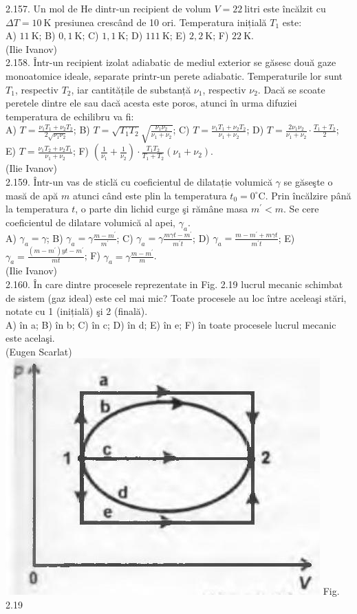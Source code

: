 2.157. Un mol de He dintr-un recipient de volum $V=22 \mathrm{~litri}$ este încălzit cu $\Delta T=10 \mathrm{~K}$ presiunea crescând de 10 ori. Temperatura inițială $T_{1}$ este:\\ A) $11 \mathrm{~K}$; B) $0,1 \mathrm{~K}$; C) $1,1 \mathrm{~K}$; D) $111 \mathrm{~K}$; E) $2,2 \mathrm{~K}$; F) $22 \mathrm{~K}$.\\ (Ilie Ivanov)\\

2.158. Într-un recipient izolat adiabatic de mediul exterior se găsesc două gaze monoatomice ideale, separate printr-un perete adiabatic. Temperaturile lor sunt $T_{1}$, respectiv $T_{2}$, iar cantitățile de substanță $\nu_{1}$, respectiv $\nu_{2}$. Dacă se scoate peretele dintre ele sau dacă acesta este poros, atunci în urma difuziei temperatura de echilibru va fi:\\ A) $T=\frac{\nu_{1} T_{1}+\nu_{2} T_{2}}{2 \sqrt{\nu_{1} \nu_{2}}}$; B) $T=\sqrt{T_{1} T_{2}} \sqrt{\frac{\nu_{1} \nu_{2}}{\nu_{1}+\nu_{2}}}$; C) $T=\frac{\nu_{1} T_{1}+\nu_{2} T_{2}}{\nu_{1}+\nu_{2}}$; D) $T=\frac{2 \nu_{1} \nu_{2}}{\nu_{1}+\nu_{2}} \cdot \frac{T_{1}+T_{2}}{2}$; E) $T=\frac{\nu_{1} T_{2}+\nu_{2} T_{1}}{\nu_{1}+\nu_{2}}$; F) $\left(\frac{1}{\nu_{1}}+\frac{1}{\nu_{2}}\right) \cdot \frac{T_{1} T_{2}}{T_{1}+T_{2}}\left(\nu_{1}+\nu_{2}\right)$.\\ (Ilie Ivanov)\\

2.159. Într-un vas de sticlă cu coeficientul de dilatație volumică $\gamma$ se găseşte o masă de apă $m$ atunci când este plin la temperatura $t_{0}=0^{\circ} \mathrm{C}$. Prin încălzire până la temperatura $t$, o parte din lichid curge şi rămâne masa $m^{\prime}<m$. Se cere coeficientul de dilatare volumică al apei, $\gamma_{a}$.\\ A) $\gamma_{a}=\gamma$; B) $\gamma_{a}=\gamma \frac{m-m^{\prime}}{m^{\prime}}$; C) $\gamma_{a}=\gamma \frac{m \gamma t-m^{\prime}}{m^{\prime} t}$; D) $\gamma_{a}=\frac{m-m^{\prime}+m \gamma t}{m^{\prime} t}$; E) $\gamma_{a}=\frac{\left(m-m^{\prime}\right) y t-m^{\prime}}{m t}$; F) $\gamma_{a}=\gamma \frac{m-m^{\prime}}{m}$.\\ (Ilie Ivanov)\\

2.160. În care dintre procesele reprezentate in Fig. 2.19 lucrul mecanic schimbat de sistem (gaz ideal) este cel mai mic? Toate procesele au loc între aceleaşi stări, notate cu 1 (inițială) şi 2 (finală).\\ A) în a; B) în b; C) în c; D) în d; E) în e; F) în toate procesele lucrul mecanic este acelaşi.\\ (Eugen Scarlat)\\ \includegraphics[width=0.4\linewidth]{images/2025_07_01_5b3ff9fa0d508c8e9f17g-109(1)} Fig. 2.19\\

